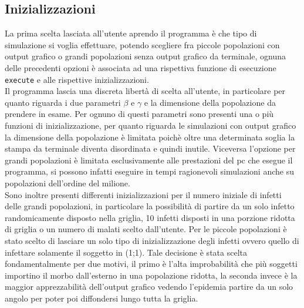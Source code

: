 \documentclass[a4paper]{article}
\begin{document}
\subsection{Inizializzazioni}
La prima scelta lasciata all'utente aprendo il programma è che tipo di simulazione si voglia effettuare, potendo scegliere fra piccole popolazioni con output grafico o grandi popolazioni senza output grafico da terminale, ognuna delle precedenti opzioni è associata ad una rispettiva funzione di esecuzione \texttt{execute} e alle rispettive inizializzazioni.\\
Il programma lascia una discreta libertà di scelta all'utente, in particolare per quanto riguarda i due parametri  $\beta$ e $\gamma$ e la dimensione della popolazione da prendere in esame. Per ognuno di questi parametri sono presenti una o più funzioni di inizializzazione, per quanto riguarda le simulazioni con output grafico la dimensione della popolazione è limitata poichè oltre una determinata soglia la stampa da terminale diventa disordinata e quindi inutile. Viceversa l'opzione per grandi popolazioni è limitata esclusivamente alle prestazioni del pc che esegue il programma, si possono infatti eseguire in tempi ragionevoli simulazioni anche su popolazioni dell'ordine del milione.\\
Sono inoltre presenti differenti inizializzazioni per il numero iniziale di infetti delle grandi popolazioni, in particolare la possibilità di partire da un solo infetto randomicamente disposto nella griglia, 10 infetti disposti in una porzione ridotta di griglia o un numero di malati scelto dall'utente. Per le piccole popolazioni è stato scelto di lasciare un solo tipo di inizializzazione degli infetti ovvero quello di infettare solamente il soggetto in (1;1). Tale decisione è stata scelta fondamentalmente per due motivi, il primo è l'alta improbabilità che più soggetti importino il morbo dall'esterno in una popolazione ridotta, la seconda invece è la maggior apprezzabilità dell'output grafico vedendo l'epidemia partire da un solo angolo per poter poi diffondersi lungo tutta la griglia. \\
\end{document}
